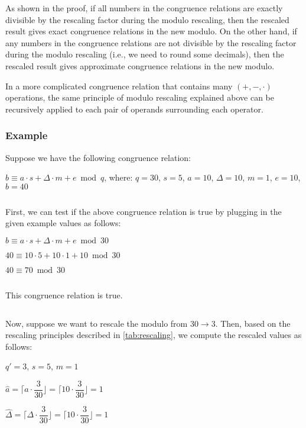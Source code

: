 As shown in the proof, if all numbers in the congruence relations are exactly divisible by the rescaling factor during the modulo rescaling, then the rescaled result gives exact congruence relations in the new modulo. On the other hand, if any numbers in the congruence relations are not divisible by the rescaling factor during the modulo rescaling (i.e., we need to round some decimals), then the rescaled result gives approximate congruence relations in the new modulo.

In a more complicated congruence relation that contains many $(+, -, \cdot)$ operations, the same principle of modulo rescaling explained above can be recursively applied to each pair of operands surrounding each operator. 

\subsubsection{Example}
\label{subsec:modulo-rescaling-ex}

Suppose we have the following congruence relation:

$b \equiv a\cdot s + \Delta \cdot m + e \bmod q$, \text{ } where: $q = 30$, \text{ } $s = 5$, \text{ } $a = 10$, \text{ } $\Delta = 10$, \text{ } $m = 1$, \text{ } $e = 10$, \text{ } $b = 40$

$ $

First, we can test if the above congruence relation is true by plugging in the given example values as follows: 

$b \equiv a\cdot s + \Delta \cdot m + e \bmod 30$

$40 \equiv 10 \cdot 5 + 10 \cdot 1 + 10 \bmod 30$

$40 \equiv 70 \bmod 30$ 

$ $

This congruence relation is true. 

$ $

Now, suppose we want to rescale the modulo from $30 \rightarrow 3$. Then, based on the rescaling principles described in \autoref{tab:rescaling}, we compute the rescaled values as follows: 

$q'= 3$, \text{ } $s = 5$, \text{ } $m = 1$

$\hat{a} = \Bigg\lceil a\cdot\dfrac{3}{30} \Bigg\rfloor = \Bigg\lceil 10\cdot\dfrac{3}{30} \Bigg\rfloor = 1$

$\hat{\Delta} = \Bigg\lceil \Delta\cdot\dfrac{3}{30} \Bigg\rfloor = \Bigg\lceil 10\cdot\dfrac{3}{30} \Bigg\rfloor = 1$



